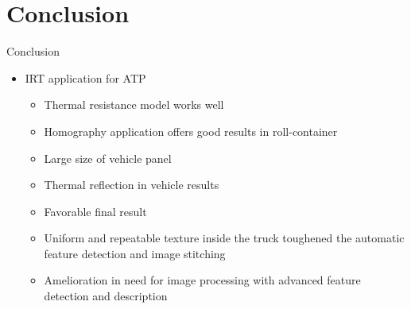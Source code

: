 \documentclass{beamer}
\begin{document}


\section{Conclusion}

\begin{frame}{Conclusion}
    \begin{itemize}%
        \item IRT application for ATP
        \begin{itemize}
	        \item Thermal resistance model works well
	        \item Homography application offers good results in roll-container
	        \item Large size of vehicle panel 
	        \item Thermal reflection in vehicle results
	        \pause
	        \item Favorable final result
	        \item Uniform and repeatable texture inside the truck toughened the automatic feature detection and image stitching
	        \item Amelioration in need for image processing with advanced feature detection and description	        
        \end{itemize}
    \end{itemize}
\end{frame}
\end{document}
